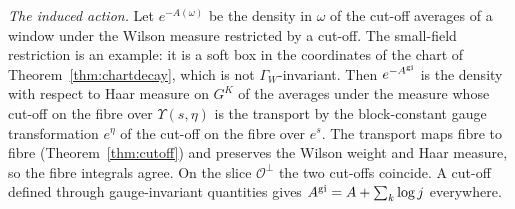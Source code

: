 \documentclass[11pt]{amsart}
\theoremstyle{definition}
\theoremstyle{remark}
\numberwithin{equation}{section}
\begin{document}
\emph{The induced action.} Let $e^{-A(\omega)}$ be the density in $\omega$
of the cut-off averages of a window under the Wilson measure restricted by a
cut-off. The small-field restriction is an example: it is a soft box in the
coordinates of the chart of Theorem~\ref{thm:chartdecay}, which is not
$\Gamma_W$-invariant. Then $e^{-A^{\rm gi}}$ is the density with respect to
Haar measure on $G^K$ of the averages under the measure whose cut-off on
the fibre over $\Upsilon(s,\eta)$ is the transport by the block-constant
gauge transformation $e^\eta$ of the cut-off on the fibre over $e^s$. The
transport maps fibre to fibre (Theorem~\ref{thm:cutoff}) and preserves the
Wilson weight and Haar measure, so the fibre integrals agree. On the slice
$\mathcal O^\perp$ the two cut-offs coincide. A cut-off defined through
gauge-invariant quantities gives $A^{\rm gi}=A+\sum_k\log j$ everywhere.
\end{document}
